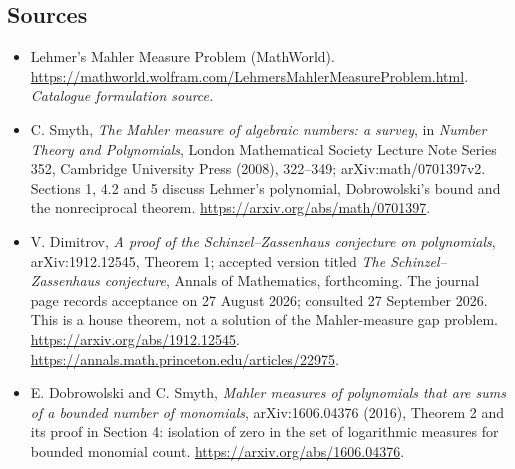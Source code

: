\documentclass[11pt,a4paper]{article}
\begin{document}
\subsection{Sources}
\begin{itemize}\raggedright
\item[\textnormal{[S1]}]\hypertarget{source:30003556:1}{} Lehmer's Mahler Measure Problem (MathWorld).
\url{https://mathworld.wolfram.com/LehmersMahlerMeasureProblem.html}.
{\small\textit{Catalogue formulation source.}}
\item[\textnormal{[E1]}]\hypertarget{extra:30003556:1}{}
C. Smyth, \emph{The Mahler measure of algebraic numbers: a survey},
in \emph{Number Theory and Polynomials}, London Mathematical Society
Lecture Note Series 352, Cambridge University Press (2008), 322--349;
arXiv:math/0701397v2. Sections 1, 4.2 and 5 discuss Lehmer's polynomial,
Dobrowolski's bound and the nonreciprocal theorem.
\url{https://arxiv.org/abs/math/0701397}.
\item[\textnormal{[E2]}]\hypertarget{extra:30003556:2}{}
V. Dimitrov, \emph{A proof of the Schinzel--Zassenhaus conjecture on
polynomials}, arXiv:1912.12545, Theorem 1; accepted version titled
\emph{The Schinzel--Zassenhaus conjecture}, Annals of Mathematics,
forthcoming. The journal page records acceptance on 27 August 2026;
consulted 27 September 2026. This is a house theorem, not a solution
of the Mahler-measure gap problem.
\url{https://arxiv.org/abs/1912.12545}.
\url{https://annals.math.princeton.edu/articles/22975}.
\item[\textnormal{[E3]}]\hypertarget{extra:30003556:3}{}
E. Dobrowolski and C. Smyth, \emph{Mahler measures of polynomials that
are sums of a bounded number of monomials}, arXiv:1606.04376 (2016),
Theorem 2 and its proof in Section 4: isolation of zero in the set
of logarithmic measures for bounded monomial count.
\url{https://arxiv.org/abs/1606.04376}.
\end{itemize}
\end{document}
